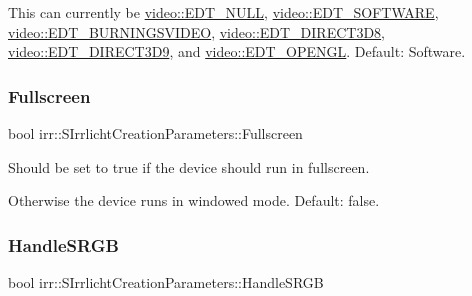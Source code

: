 This can currently be \hyperlink{namespaceirr_1_1video_ae35a6de6d436c76107ad157fe42356d0a847cc228389396d6228c00aadf461ecb}{video\+::\+E\+D\+T\+\_\+\+N\+U\+LL}, \hyperlink{namespaceirr_1_1video_ae35a6de6d436c76107ad157fe42356d0ad863d9225d42c1f9ea1eb7ad89a712ce}{video\+::\+E\+D\+T\+\_\+\+S\+O\+F\+T\+W\+A\+RE}, \hyperlink{namespaceirr_1_1video_ae35a6de6d436c76107ad157fe42356d0aa87258b02ce4380dccb0eb430310ec1c}{video\+::\+E\+D\+T\+\_\+\+B\+U\+R\+N\+I\+N\+G\+S\+V\+I\+D\+EO}, \hyperlink{namespaceirr_1_1video_ae35a6de6d436c76107ad157fe42356d0a19a7bf582b8ea551a9cc4937e970ba8b}{video\+::\+E\+D\+T\+\_\+\+D\+I\+R\+E\+C\+T3\+D8}, \hyperlink{namespaceirr_1_1video_ae35a6de6d436c76107ad157fe42356d0ac922b56714df5a2ed7b8181c56ac7e99}{video\+::\+E\+D\+T\+\_\+\+D\+I\+R\+E\+C\+T3\+D9}, and \hyperlink{namespaceirr_1_1video_ae35a6de6d436c76107ad157fe42356d0a5ab2832f3a74d496e443105ab943cd6c}{video\+::\+E\+D\+T\+\_\+\+O\+P\+E\+N\+GL}. Default\+: Software. \mbox{\label{structirr_1_1SIrrlichtCreationParameters_a40c03ef099d60cec514697baf0b64214}} 
\subsubsection{\texorpdfstring{Fullscreen}{Fullscreen}}
{\footnotesize\ttfamily bool irr\+::\+S\+Irrlicht\+Creation\+Parameters\+::\+Fullscreen}



Should be set to true if the device should run in fullscreen. 

Otherwise the device runs in windowed mode. Default\+: false. \mbox{\label{structirr_1_1SIrrlichtCreationParameters_a4808090b31a2a0e004066bded7bfefc6}} 
\subsubsection{\texorpdfstring{Handle\+S\+R\+GB}{HandleSRGB}}
{\footnotesize\ttfamily bool irr\+::\+S\+Irrlicht\+Creation\+Parameters\+::\+Handle\+S\+R\+GB}



